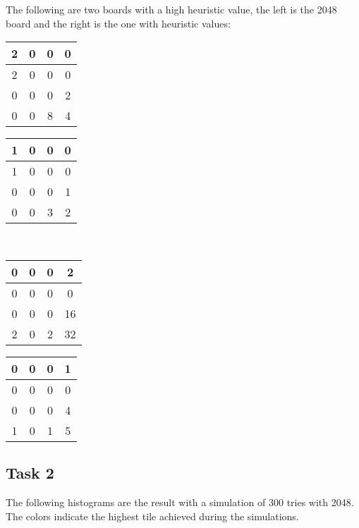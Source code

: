 \documentclass[a4paper,12pt]{article}
\begin{document}
The following are two boards with a high heuristic value, the left is the 2048 board and the right is the one with heuristic values:
\begin{center}
\begin{tabular}{| c | c | c | c |}
        \hline
        2 & 0 & 0 & 0  \\
        \hline
        2 & 0 & 0 & 0  \\
        \hline
        0 & 0 & 0 & 2   \\
        \hline
        0 & 0 & 8 & 4\\
        \hline
\end{tabular}
\hspace{0.4cm}
\begin{tabular}{| c | c | c | c |}
        \hline
        1 & 0 & 0 & 0  \\
        \hline
        1 & 0 & 0 & 0  \\
        \hline
        0 & 0 & 0 & 1   \\
        \hline
        0 & 0 & 3 & 2   \\
        \hline
\end{tabular}
\end{center}
\\

\begin{center}
\begin{tabular}{| c | c | c | c |}
        \hline
        0 & 0 & 0 & 2  \\
        \hline
        0 & 0 & 0 & 0  \\
        \hline
        0 & 0 & 0 & 16   \\
        \hline
        2 & 0 & 2 & 32\\
        \hline
\end{tabular}
\hspace{0.4cm}
\begin{tabular}{| c | c | c | c |}
        \hline
        0 & 0 & 0 & 1  \\
        \hline
        0 & 0 & 0 & 0  \\
        \hline
        0 & 0 & 0 & 4   \\
        \hline
        1 & 0 & 1 & 5   \\
        \hline
\end{tabular}
\end{center}


\subsection{Task 2}
The following histograms are the result with a simulation of 300 tries with 2048. The colors indicate the highest tile achieved during the simulations.
\end{document}
